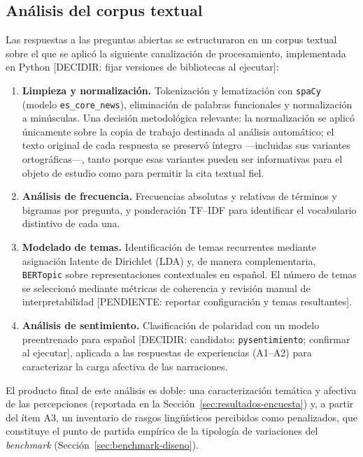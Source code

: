 \subsection{Análisis del corpus textual}
\label{sec:analisis-corpus}

Las respuestas a las preguntas abiertas se estructuraron en un corpus textual
sobre el que se aplicó la siguiente canalización de procesamiento, implementada
en Python [DECIDIR: fijar versiones de bibliotecas al ejecutar]:

\begin{enumerate}
  \item \textbf{Limpieza y normalización.} Tokenización y lematización con
    \texttt{spaCy} (modelo \texttt{es\_core\_news}), eliminación de palabras
    funcionales y normalización a minúsculas. Una decisión metodológica
    relevante: la normalización se aplicó únicamente sobre la copia de trabajo
    destinada al análisis automático; el texto original de cada respuesta se
    preservó íntegro ---incluidas sus variantes ortográficas---, tanto porque
    esas variantes pueden ser informativas para el objeto de estudio como para
    permitir la cita textual fiel.
  \item \textbf{Análisis de frecuencia.} Frecuencias absolutas y relativas de
    términos y bigramas por pregunta, y ponderación TF--IDF para identificar
    el vocabulario distintivo de cada una.
  \item \textbf{Modelado de temas.} Identificación de temas recurrentes
    mediante asignación latente de Dirichlet (LDA) y, de manera
    complementaria, \texttt{BERTopic} sobre representaciones contextuales en
    español. El número de temas se seleccionó mediante métricas de coherencia
    y revisión manual de interpretabilidad
    [PENDIENTE: reportar configuración y temas resultantes].
  \item \textbf{Análisis de sentimiento.} Clasificación de polaridad con un
    modelo preentrenado para español [DECIDIR: candidato:
    \texttt{pysentimiento}; confirmar al ejecutar], aplicada a las respuestas
    de experiencias (A1--A2) para caracterizar la carga afectiva de las
    narraciones.
\end{enumerate}

El producto final de este análisis es doble: una caracterización temática y
afectiva de las percepciones (reportada en la
Sección~\ref{sec:resultados-encuesta}) y, a partir del ítem A3, un inventario
de rasgos lingüísticos percibidos como penalizados, que constituye el punto de
partida empírico de la tipología de variaciones del \emph{benchmark}
(Sección~\ref{sec:benchmark-diseno}).

